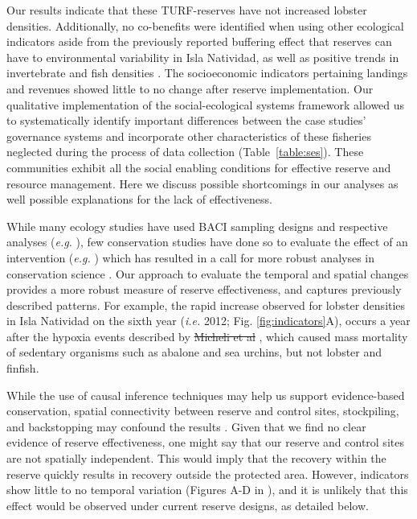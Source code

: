 \documentclass[10pt,letterpaper]{article}
\providecommand{\DIFdeltex}[1]{{\protect\color{red}\sout{#1}}}                      %
\providecommand{\DIFdelbegin}{} %
\providecommand{\DIFdelend}{} %
\providecommand{\DIFdel}[1]{\texorpdfstring{\DIFdeltex{#1}}{}} %
\newcommand{\DIFscaledelfig}{0.5}
\newlength{\DIFdelgraphicswidth} %
\newlength{\DIFdelgraphicsheight} %
\newcommand{\DIFdelincludegraphics}[2][]{%
\sbox{\DIFdelgraphicsbox}{\DIFOincludegraphics[#1]{#2}}%
\settoboxwidth{\DIFdelgraphicswidth}{\DIFdelgraphicsbox} %
\settoboxtotalheight{\DIFdelgraphicsheight}{\DIFdelgraphicsbox} %
\scalebox{\DIFscaledelfig}{%
\parbox[b]{\DIFdelgraphicswidth}{\usebox{\DIFdelgraphicsbox}\\[-\baselineskip] \rule{\DIFdelgraphicswidth}{0em}}\llap{\resizebox{\DIFdelgraphicswidth}{\DIFdelgraphicsheight}{%
\setlength{\unitlength}{\DIFdelgraphicswidth}%
\begin{picture}(1,1)%
\thicklines\linethickness{2pt} %
{\color[rgb]{1,0,0}\put(0,0){\framebox(1,1){}}}%
{\color[rgb]{1,0,0}\put(0,0){\line( 1,1){1}}}%
{\color[rgb]{1,0,0}\put(0,1){\line(1,-1){1}}}%
\end{picture}%
}\hspace*{3pt}}} %
} %
\DeclareRobustCommand{\DIFdelbegin}{\DIFOdelbegin \let\includegraphics\DIFdelincludegraphics} %
\DeclareRobustCommand{\DIFdelend}{\DIFOaddend \let\includegraphics\DIFOincludegraphics} %
\begin{document}
Our results indicate that these TURF-reserves have not increased lobster densities. Additionally, no co-benefits were identified when using other ecological indicators aside from the previously reported buffering effect that reserves can have to environmental variability in Isla Natividad, as well as positive trends in invertebrate and fish densities \cite{micheli_2012-EU,Villasenor-Derbez_2018}. The socioeconomic indicators pertaining landings and revenues showed little to no change after reserve implementation. Our qualitative implementation of the social-ecological systems framework allowed us to systematically identify important differences between the case studies’ governance systems and incorporate other characteristics of these fisheries neglected during the process of data collection (Table~\ref{table:ses}). These communities exhibit all the social enabling conditions for effective reserve and resource management. Here we discuss possible shortcomings in our analyses as well possible explanations for the lack of effectiveness.

While many ecology studies have used BACI sampling designs and respective analyses (\emph{e.g.} \cite{stewartoaten_1986}), few conservation studies have done so to evaluate the effect of an intervention (\emph{e.g.} \cite{francinifilho_2008,lester_2009,moland_2013,kerr_2019}) which has resulted in a call for more robust analyses in conservation science \cite{guidetti_2002,ferraro_2006}. Our approach to evaluate the temporal and spatial changes provides a more robust measure of reserve effectiveness, and captures previously described patterns. For example, the rapid increase observed for lobster densities in Isla Natividad on the sixth year (\emph{i.e.} 2012; Fig. \ref{fig:indicators}A), occurs a year after the hypoxia events described by \DIFdelbegin \DIFdel{Micheli et al }\DIFdelend \cite{micheli_2012-EU}, which caused mass mortality of sedentary organisms such as abalone and sea urchins, but not lobster and finfish.

While the use of causal inference techniques may help us support evidence-based conservation, spatial connectivity between reserve and control sites, stockpiling, and backstopping may confound the results \cite{kerr_2019}. Given that we find no clear evidence of reserve effectiveness, one might say that our reserve and control sites are not spatially independent. This would imply that the recovery within the reserve quickly results in recovery outside the protected area. However, indicators show little to no temporal variation (Figures A-D in ), and it is unlikely that this effect would be observed under current reserve designs, as detailed below.
\end{document}
